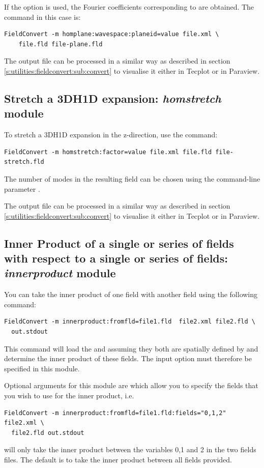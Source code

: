 If the option  is used, the Fourier coefficients
corresponding to  are obtained. The command in this case is:
\begin{lstlisting}[style=BashInputStyle]
FieldConvert -m homplane:wavespace:planeid=value file.xml \
    file.fld file-plane.fld
\end{lstlisting}

The output file  can be processed in a similar
way as described in section \ref{s:utilities:fieldconvert:sub:convert}
to visualise it either in Tecplot or in Paraview.

\subsection{Stretch a 3DH1D expansion: \textit{homstretch} module}

To stretch a 3DH1D expansion in the z-direction, use the command:
\begin{lstlisting}[style=BashInputStyle]
FieldConvert -m homstretch:factor=value file.xml file.fld file-stretch.fld
\end{lstlisting}
The number of modes in the resulting field can be chosen using the command-line
parameter \inltt{-{}-output-points-hom-z}.

The output file  can be processed in a similar
way as described in section \ref{s:utilities:fieldconvert:sub:convert}
to visualise it either in Tecplot or in Paraview.


\subsection{Inner Product of a single or series of fields with respect to a single or series of fields: \textit{innerproduct} module}
You can take the inner product of one field with another field using
the following command:
\begin{lstlisting}[style=BashInputStyle]
  FieldConvert -m innerproduct:fromfld=file1.fld  file2.xml file2.fld \
  out.stdout
\end{lstlisting}
This command will load the  and 
assuming they both are spatially defined by  and
determine the inner product of these fields. The input option
\inltt{fromfld} must therefore be specified in this module.

Optional arguments for this module are  which allow you to specify
the fields that you wish to use for the inner product, i.e.
\begin{lstlisting}[style=BashInputStyle]
  FieldConvert -m innerproduct:fromfld=file1.fld:fields="0,1,2" file2.xml \
  file2.fld out.stdout
\end{lstlisting}
will only take the inner product between the variables 0,1 and 2 in
the two fields files. The default is to take the inner product between
all fields provided.

